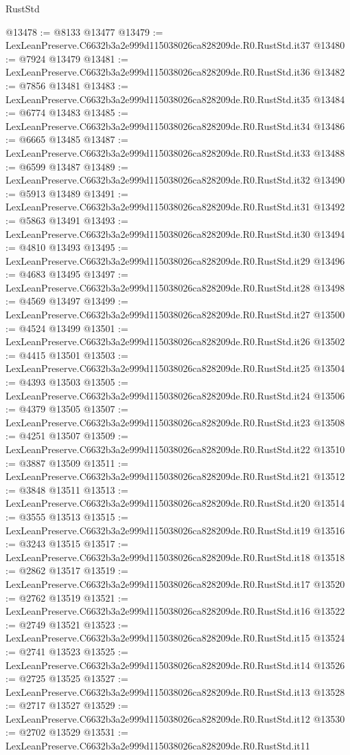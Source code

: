 \begin{lexlean}{RustStd}
\begin{coremodule}
@13478 := @8133 @13477
@13479 := LexLeanPreserve.C6632b3a2e999d115038026ca828209de.R0.RustStd.it37
@13480 := @7924 @13479
@13481 := LexLeanPreserve.C6632b3a2e999d115038026ca828209de.R0.RustStd.it36
@13482 := @7856 @13481
@13483 := LexLeanPreserve.C6632b3a2e999d115038026ca828209de.R0.RustStd.it35
@13484 := @6774 @13483
@13485 := LexLeanPreserve.C6632b3a2e999d115038026ca828209de.R0.RustStd.it34
@13486 := @6665 @13485
@13487 := LexLeanPreserve.C6632b3a2e999d115038026ca828209de.R0.RustStd.it33
@13488 := @6599 @13487
@13489 := LexLeanPreserve.C6632b3a2e999d115038026ca828209de.R0.RustStd.it32
@13490 := @5913 @13489
@13491 := LexLeanPreserve.C6632b3a2e999d115038026ca828209de.R0.RustStd.it31
@13492 := @5863 @13491
@13493 := LexLeanPreserve.C6632b3a2e999d115038026ca828209de.R0.RustStd.it30
@13494 := @4810 @13493
@13495 := LexLeanPreserve.C6632b3a2e999d115038026ca828209de.R0.RustStd.it29
@13496 := @4683 @13495
@13497 := LexLeanPreserve.C6632b3a2e999d115038026ca828209de.R0.RustStd.it28
@13498 := @4569 @13497
@13499 := LexLeanPreserve.C6632b3a2e999d115038026ca828209de.R0.RustStd.it27
@13500 := @4524 @13499
@13501 := LexLeanPreserve.C6632b3a2e999d115038026ca828209de.R0.RustStd.it26
@13502 := @4415 @13501
@13503 := LexLeanPreserve.C6632b3a2e999d115038026ca828209de.R0.RustStd.it25
@13504 := @4393 @13503
@13505 := LexLeanPreserve.C6632b3a2e999d115038026ca828209de.R0.RustStd.it24
@13506 := @4379 @13505
@13507 := LexLeanPreserve.C6632b3a2e999d115038026ca828209de.R0.RustStd.it23
@13508 := @4251 @13507
@13509 := LexLeanPreserve.C6632b3a2e999d115038026ca828209de.R0.RustStd.it22
@13510 := @3887 @13509
@13511 := LexLeanPreserve.C6632b3a2e999d115038026ca828209de.R0.RustStd.it21
@13512 := @3848 @13511
@13513 := LexLeanPreserve.C6632b3a2e999d115038026ca828209de.R0.RustStd.it20
@13514 := @3555 @13513
@13515 := LexLeanPreserve.C6632b3a2e999d115038026ca828209de.R0.RustStd.it19
@13516 := @3243 @13515
@13517 := LexLeanPreserve.C6632b3a2e999d115038026ca828209de.R0.RustStd.it18
@13518 := @2862 @13517
@13519 := LexLeanPreserve.C6632b3a2e999d115038026ca828209de.R0.RustStd.it17
@13520 := @2762 @13519
@13521 := LexLeanPreserve.C6632b3a2e999d115038026ca828209de.R0.RustStd.it16
@13522 := @2749 @13521
@13523 := LexLeanPreserve.C6632b3a2e999d115038026ca828209de.R0.RustStd.it15
@13524 := @2741 @13523
@13525 := LexLeanPreserve.C6632b3a2e999d115038026ca828209de.R0.RustStd.it14
@13526 := @2725 @13525
@13527 := LexLeanPreserve.C6632b3a2e999d115038026ca828209de.R0.RustStd.it13
@13528 := @2717 @13527
@13529 := LexLeanPreserve.C6632b3a2e999d115038026ca828209de.R0.RustStd.it12
@13530 := @2702 @13529
@13531 := LexLeanPreserve.C6632b3a2e999d115038026ca828209de.R0.RustStd.it11

\end{coremodule}
\end{lexlean}
